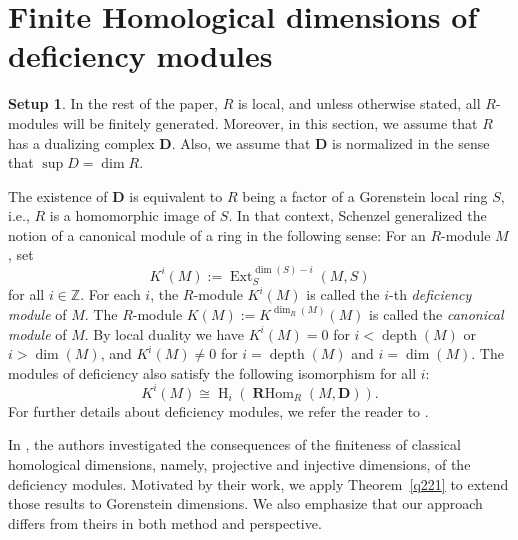 \documentclass[11pt, a4paper,pagebackref]{amsart}
\numberwithin{equation}{section}
\theoremstyle{definition}
\newtheorem{remark and definition}[theorem]{Remark and Definition}
\newtheorem{remark and notation}[theorem]{Remark and Notation}
\newtheorem*{setup}{Setup}
\newcommand\Ext{\operatorname{Ext}}
\newcommand\depth{\operatorname{depth}}
\newcommand\RHom{\operatorname{\mathbf{R}Hom}}
\begin{document}
\section{Finite Homological dimensions of deficiency modules}\label{sectiondeficiencymodules}

\begin{setup}
In the rest of the paper, $R$ is local, and unless otherwise stated, all $R$-modules will be finitely generated. Moreover, in this section, we assume that $R$ has a dualizing complex $\boldsymbol{D}$. Also, we assume that $\boldsymbol{D}$ is normalized in the sense that $\sup D=\dim R$. 
\end{setup}

The existence of $\boldsymbol{D}$ is equivalent to $R$ being a factor of a Gorenstein local ring $S$, i.e., $R$ is a homomorphic image of $S$. In that context, Schenzel \cite{Sch98} generalized the notion of a canonical module of a ring in the following sense: For an $R$-module $M$, set 
$$K^i(M):=\Ext_S^{\dim (S)-i}(M,S)$$
for all $i \in \mathbb{Z}$. For each $i$, the $R$-module $K^i(M)$ is called the $i$-th \textit{deficiency module} of $M$. The $R$-module $K(M):=K^{\dim_R(M)}(M)$ is called the \textit{canonical module} of $M$. By local duality we have $K^i(M)=0$ for $i<\depth(M)$ or $i>\dim(M)$, and $K^i(M)\neq0$ for $i=\depth (M)$ and $i=\dim (M)$. The modules of deficiency also satisfy the following isomorphism for all $i$:
\begin{equation*}\label{112}
    K^i(M) \cong  \operatorname{H}_{i}(\RHom_R(M, \boldsymbol{D})).
\end{equation*}
For further details about deficiency modules, we refer the reader to \cite{Sch98}.
 



 In \cite{FH}, the authors investigated the consequences of the finiteness of classical homological dimensions, namely, projective and injective dimensions, of the deficiency modules.  Motivated by their work, we apply Theorem~\ref{q221} to extend those results to Gorenstein dimensions. We also emphasize that our approach differs from theirs in both method and perspective.
\end{document}

